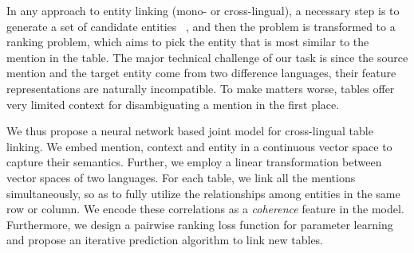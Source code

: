 
In any approach to entity linking (mono- or cross-lingual), 
a necessary step is to generate a set of candidate entities
~\cite{tsai2016cross,mcnamee2011cross,bhagavatula2015tabel,wu2016entity},
and then the problem is transformed to a ranking problem, which aims to pick
the entity that is most similar to the mention in the table. 
The major technical challenge of our task is since the source mention
and the target entity come from two difference languages,
their feature representations are naturally incompatible. 
To make matters worse, tables offer very limited context for disambiguating
a mention in the first place.


We thus propose a neural network based joint model for cross-lingual table linking. 
We embed mention, context and entity in a continuous vector space to 
capture their semantics.
Further, we employ a linear transformation between vector spaces of two languages. 
For each table, we link all the mentions simultaneously, 
so as to fully utilize the relationships among entities 
in the same row or column. We encode these correlations as a 
{\em coherence} feature in the model.
Furthermore, we design a pairwise ranking loss function for parameter 
learning and propose an iterative prediction algorithm to link new tables.


%


